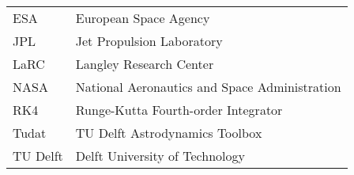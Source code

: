 
\begin{longtable}[l]{l l}




ESA & European Space Agency \\





JPL & Jet Propulsion Laboratory \\


LaRC & Langley Research Center \\


NASA & National Aeronautics and Space Administration \\



RK4 & Runge-Kutta Fourth-order Integrator \\


Tudat & TU Delft Astrodynamics Toolbox \\
TU Delft & Delft University of Technology \\







\end{longtable}